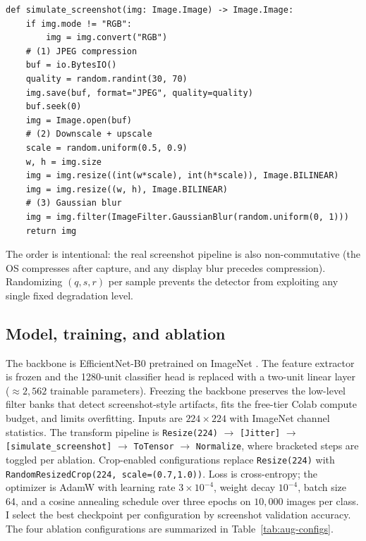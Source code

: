 \documentclass{article}
\begin{document}
\begin{lstlisting}[caption={The \texttt{simulate\_screenshot} function, the
core augmentation used throughout this work. Framework-agnostic
(PIL in, PIL out) and wires into any \texttt{torchvision.transforms.Compose}
via \texttt{transforms.Lambda}.},label={lst:ss}]
def simulate_screenshot(img: Image.Image) -> Image.Image:
    if img.mode != "RGB":
        img = img.convert("RGB")
    # (1) JPEG compression
    buf = io.BytesIO()
    quality = random.randint(30, 70)
    img.save(buf, format="JPEG", quality=quality)
    buf.seek(0)
    img = Image.open(buf)
    # (2) Downscale + upscale
    scale = random.uniform(0.5, 0.9)
    w, h = img.size
    img = img.resize((int(w*scale), int(h*scale)), Image.BILINEAR)
    img = img.resize((w, h), Image.BILINEAR)
    # (3) Gaussian blur
    img = img.filter(ImageFilter.GaussianBlur(random.uniform(0, 1)))
    return img
\end{lstlisting}

The order is intentional: the real screenshot pipeline is also
non-commutative (the OS compresses after capture, and any display
blur precedes compression). Randomizing $(q, s, r)$ per sample
prevents the detector from exploiting any single fixed degradation
level.

\subsection{Model, training, and ablation}
The backbone is EfficientNet-B0 \citep{tan2019efficientnet}
pretrained on ImageNet \citep{deng2009imagenet}. The feature
extractor is frozen and the 1280-unit classifier head is replaced
with a two-unit linear layer ($\approx 2{,}562$ trainable
parameters). Freezing the backbone preserves the low-level filter
banks that detect screenshot-style artifacts, fits the free-tier
Colab compute budget, and limits overfitting. Inputs are $224
\times 224$ with ImageNet channel statistics. The transform pipeline
is \texttt{Resize(224)} $\rightarrow$ \texttt{[Jitter]} $\rightarrow$
\texttt{[simulate\_screenshot]} $\rightarrow$ \texttt{ToTensor}
$\rightarrow$ \texttt{Normalize}, where bracketed steps are toggled
per ablation. Crop-enabled configurations replace
\texttt{Resize(224)} with \texttt{RandomResizedCrop(224,
scale=(0.7,1.0))}. Loss is cross-entropy; the optimizer is AdamW with
learning rate $3 \times 10^{-4}$, weight decay $10^{-4}$, batch size
64, and a cosine annealing schedule over three epochs on $10{,}000$
images per class. I select the best checkpoint per configuration by
screenshot validation accuracy. The four ablation configurations
are summarized in Table~\ref{tab:aug-configs}.
\end{document}
